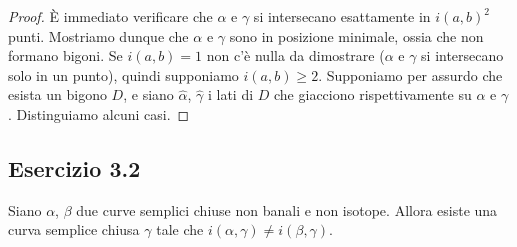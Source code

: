 \begin{proof}
È immediato verificare che $\alpha$ e $\gamma$ si intersecano esattamente in $i(a,b)^2$ punti. Mostriamo dunque che $\alpha$ e $\gamma$ sono in posizione minimale, ossia che non formano bigoni. Se $i(a,b)=1$ non c'è nulla da dimostrare ($\alpha$ e $\gamma$ si intersecano solo in un punto), quindi supponiamo $i(a,b)\ge 2$. Supponiamo per assurdo che esista un bigono $D$, e siano $\hat\alpha$, $\hat\gamma$ i lati di $D$ che giacciono rispettivamente su $\alpha$ e $\gamma$. Distinguiamo alcuni casi.
\end{proof}


\subsection*{Esercizio 3.2}
\begin{lemma}
Siano $\alpha$, $\beta$ due curve semplici chiuse non banali e non isotope. Allora esiste una curva semplice chiusa $\gamma$ tale che $i(\alpha,\gamma)\neq i(\beta,\gamma)$.
\end{lemma}
